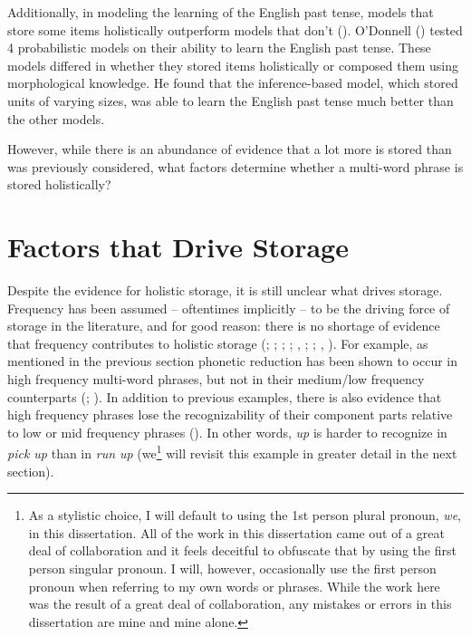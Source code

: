 \documentclass[
  12pt,
  letterpaper,
]{scrreprt}
\begin{document}
Additionally, in modeling the learning of the English past tense, models
that store some items holistically outperform models that don't
().
O'Donnell ()
tested 4 probabilistic models on their ability to learn the English past
tense. These models differed in whether they stored items holistically
or composed them using morphological knowledge. He found that the
inference-based model, which stored units of varying sizes, was able to
learn the English past tense much better than the other models.

However, while there is an abundance of evidence that a lot more is
stored than was previously considered, what factors determine whether a
multi-word phrase is stored holistically?

\section{Factors that Drive
Storage}\label{sec-factors-that-drive-storage}

Despite the evidence for holistic storage, it is still unclear what
drives storage. Frequency has been assumed -- oftentimes implicitly --
to be the driving force of storage in the literature, and for good
reason: there is no shortage of evidence that frequency contributes to
holistic storage (;
;
;
; ,
;
; ,
). For example, as
mentioned in the previous section phonetic reduction has been shown to
occur in high frequency multi-word phrases, but not in their medium/low
frequency counterparts (;
).
In addition to previous examples, there is also evidence that high
frequency phrases lose the recognizability of their component parts
relative to low or mid frequency phrases
(). In other words, \emph{up} is harder to recognize in
\emph{pick up} than in \emph{run up} (we\footnote{As a stylistic choice,
  I will default to using the 1st person plural pronoun, \emph{we}, in
  this dissertation. All of the work in this dissertation came out of a
  great deal of collaboration and it feels deceitful to obfuscate that
  by using the first person singular pronoun. I will, however,
  occasionally use the first person pronoun when referring to my own
  words or phrases. While the work here was the result of a great deal
  of collaboration, any mistakes or errors in this dissertation are mine
  and mine alone.} will revisit this example in greater detail in the
next section).
\end{document}
